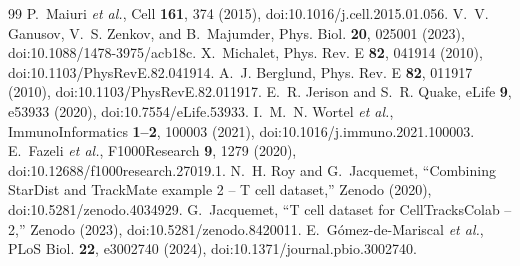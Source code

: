 \documentclass[aps,pre,10pt,twocolumn,superscriptaddress,amsmath,amssymb,floatfix]{revtex4-2}
\begin{document}
\begin{thebibliography}{99}
 P.~Maiuri \emph{et al.}, Cell \textbf{161}, 374 (2015), doi:10.1016/j.cell.2015.01.056.
 V.~V. Ganusov, V.~S. Zenkov, and B.~Majumder, Phys. Biol. \textbf{20}, 025001 (2023), doi:10.1088/1478-3975/acb18c.
 X.~Michalet, Phys. Rev. E \textbf{82}, 041914 (2010), doi:10.1103/PhysRevE.82.041914.
 A.~J. Berglund, Phys. Rev. E \textbf{82}, 011917 (2010), doi:10.1103/PhysRevE.82.011917.
 E.~R. Jerison and S.~R. Quake, eLife \textbf{9}, e53933 (2020), doi:10.7554/eLife.53933.
 I.~M.~N. Wortel \emph{et al.}, ImmunoInformatics \textbf{1--2}, 100003 (2021), doi:10.1016/j.immuno.2021.100003.
 E.~Fazeli \emph{et al.}, F1000Research \textbf{9}, 1279 (2020), doi:10.12688/f1000research.27019.1.
 N.~H. Roy and G.~Jacquemet, ``Combining StarDist and TrackMate example 2 -- T cell dataset,'' Zenodo (2020), doi:10.5281/zenodo.4034929.
 G.~Jacquemet, ``T cell dataset for CellTracksColab -- 2,'' Zenodo (2023), doi:10.5281/zenodo.8420011.
 E.~G\'omez-de-Mariscal \emph{et al.}, PLoS Biol. \textbf{22}, e3002740 (2024), doi:10.1371/journal.pbio.3002740.
\end{thebibliography}
\end{document}
